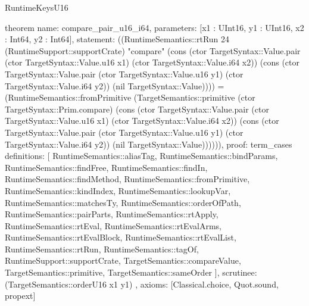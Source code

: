 \begin{lexlean}{RuntimeKeysU16}
\begin{semanticmodule}
theorem{
  name: compare_pair_u16_i64,
  parameters: [x1 : UInt16, y1 : UInt16, x2 : Int64, y2 : Int64],
  statement: ((RuntimeSemantics::rtRun 24 (RuntimeSupport::supportCrate) "compare" (cons (ctor TargetSyntax::Value.pair (ctor TargetSyntax::Value.u16 x1) (ctor TargetSyntax::Value.i64 x2)) (cons (ctor TargetSyntax::Value.pair (ctor TargetSyntax::Value.u16 y1) (ctor TargetSyntax::Value.i64 y2)) (nil TargetSyntax::Value)))) = (RuntimeSemantics::fromPrimitive (TargetSemantics::primitive (ctor TargetSyntax::Prim.compare) (cons (ctor TargetSyntax::Value.pair (ctor TargetSyntax::Value.u16 x1) (ctor TargetSyntax::Value.i64 x2)) (cons (ctor TargetSyntax::Value.pair (ctor TargetSyntax::Value.u16 y1) (ctor TargetSyntax::Value.i64 y2)) (nil TargetSyntax::Value)))))),
  proof: term_cases{
    definitions: [
      RuntimeSemantics::aliasTag,
      RuntimeSemantics::bindParams,
      RuntimeSemantics::findFree,
      RuntimeSemantics::findIn,
      RuntimeSemantics::findMethod,
      RuntimeSemantics::fromPrimitive,
      RuntimeSemantics::kindIndex,
      RuntimeSemantics::lookupVar,
      RuntimeSemantics::matchesTy,
      RuntimeSemantics::orderOfPath,
      RuntimeSemantics::pairParts,
      RuntimeSemantics::rtApply,
      RuntimeSemantics::rtEval,
      RuntimeSemantics::rtEvalArms,
      RuntimeSemantics::rtEvalBlock,
      RuntimeSemantics::rtEvalList,
      RuntimeSemantics::rtRun,
      RuntimeSemantics::tagOf,
      RuntimeSupport::supportCrate,
      TargetSemantics::compareValue,
      TargetSemantics::primitive,
      TargetSemantics::sameOrder
    ],
    scrutinee: (TargetSemantics::orderU16 x1 y1)
  },
  axioms: [Classical.choice, Quot.sound, propext]
}
\end{semanticmodule}
\end{lexlean}
